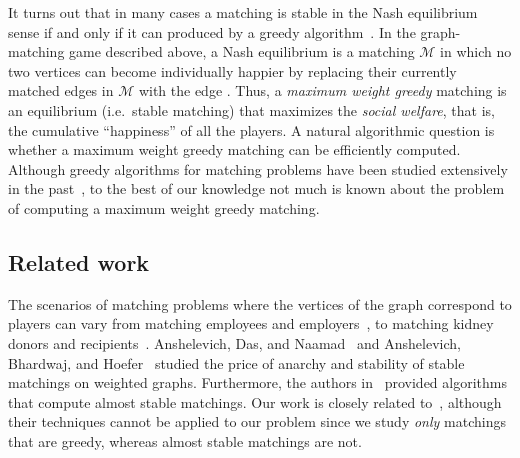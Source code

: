 \documentclass[a4paper,11pt]{article}
\newcommand{\mcal}{\ensuremath{\mathcal{M}}\xspace}
\begin{document}
It turns out that in many cases a matching is stable in the Nash equilibrium 
sense if and only if it can produced by a greedy algorithm~\cite{ADN13}. 
In the graph-matching game described above, a Nash equilibrium is a matching \mcal in which no two vertices  can become individually happier 
by replacing their currently matched edges in \mcal with the edge .
Thus, a \emph{maximum weight greedy} matching is an equilibrium (i.e.~stable matching) 
that maximizes the \emph{social welfare}, that is, the cumulative ``happiness'' of all the players.
A natural algorithmic question is whether a maximum weight greedy matching can be efficiently computed. 
Although greedy algorithms for matching problems have been studied extensively 
in the past~\cite{PS12, ADFS95, HK78, DF91, MP97, DFP93}, to the best of our knowledge
not much is known about the problem of computing a maximum weight greedy matching.




\subsection{Related work}
The scenarios of matching problems where the vertices of the graph correspond to 
players can vary from matching employees and employers~\cite{J79}, to matching
kidney donors and recipients~\cite{R04, ABS07}. Anshelevich, Das, and 
Naamad~\cite{ADN13} and Anshelevich, Bhardwaj, and Hoefer~\cite{ABH13} 
studied the price of anarchy and stability of stable matchings on weighted   graphs. Furthermore, the authors in~\cite{ADN13} provided algorithms that 
compute almost stable matchings. Our work is closely related to~\cite{ADN13}, 
although their techniques cannot be applied to our problem since we study 
\emph{only} matchings that are greedy, whereas almost stable matchings are not.
\end{document}
